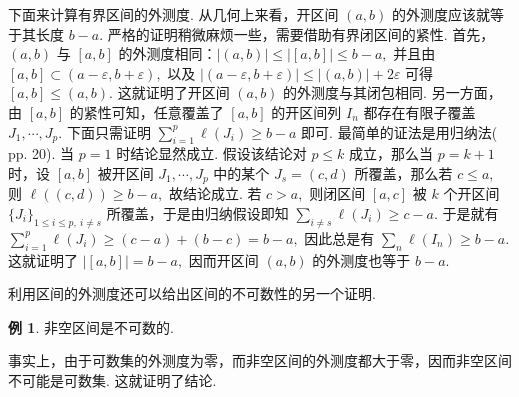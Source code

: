 \documentclass[12pt, a4paper, oneside]{book}
\numberwithin{figure}{section}
\theoremstyle{definition}
\newtheorem{example}[theorem]{例}
\begin{document}
下面来计算有界区间的外测度. 从几何上来看，开区间 $(a,b)$ 的外测度应该就等于其长度 $b-a.$ 严格的证明稍微麻烦一些，需要借助有界闭区间的紧性. 首先，$(a,b)$ 与 $[a,b]$ 的外测度相同：$|(a,b)|\leq |[a,b]|\leq b-a,$ 并且由 $[a,b]\subset (a-\varepsilon,b+\varepsilon),$ 以及 
$|(a-\varepsilon,b+\varepsilon)|\leq |(a,b)|+2\varepsilon$ 可得 $[a,b]\leq (a,b).$ 这就证明了开区间 $(a,b)$ 的外测度与其闭包相同. 另一方面，由 $[a,b]$ 的紧性可知，任意覆盖了 $[a,b]$ 的开区间列 $I_n$ 都存在有限子覆盖 $J_1,\cdots,J_p.$ 
下面只需证明 $\sum_{i=1}^p \ell(J_i)\geq b-a$ 即可. 最简单的证法是用归纳法(\cite{Axler_2020} pp. 20). 当 $p=1$ 时结论显然成立. 假设该结论对 $p\leq k$ 成立，那么当 $p=k+1$ 时，设 $[a,b]$ 被开区间 $J_1,\cdots,J_p$ 中的某个 $J_s=(c,d)$ 所覆盖，那么若 $c\leq a,$ 则 $\ell((c,d))\geq b-a,$ 故结论成立. 
若 $c>a,$ 则闭区间 $[a,c]$ 被 $k$ 个开区间 $\{J_i\}_{1\leq i\leq p,\ i\neq s}$ 所覆盖，于是由归纳假设即知 $\sum_{i\neq s}\ell(J_i)\geq c-a.$ 于是就有 $\sum_{i=1}^p \ell(J_i)\geq (c-a)+(b-c)=b-a,$ 因此总是有 
$\sum_n \ell(I_n)\geq b-a.$ 这就证明了 $|[a,b]|=b-a,$ 因而开区间 $(a,b)$ 的外测度也等于 $b-a.$

利用区间的外测度还可以给出区间的不可数性的另一个证明.
\begin{example}
    非空区间是不可数的.
\end{example}
事实上，由于可数集的外测度为零，而非空区间的外测度都大于零，因而非空区间不可能是可数集. 这就证明了结论.
\end{document}
